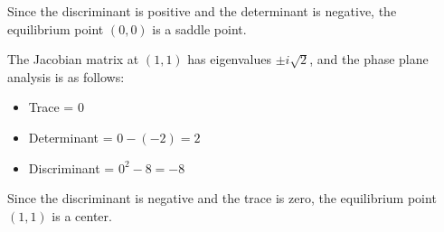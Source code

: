 \documentclass[11pt, letterpaper]{article}
\begin{document}
Since the discriminant is positive and the determinant is negative, the
equilibrium point $(0, 0)$ is a saddle point.

The Jacobian matrix at $(1, 1)$ has eigenvalues $\pm i\sqrt{2}$, and the phase
plane analysis is as follows:
\begin{itemize}
    \item Trace = $0$
    \item Determinant = $0 - (-2) = 2$
    \item Discriminant = $0^2 - 8 = -8$
\end{itemize}

Since the discriminant is negative and the trace is zero, the equilibrium point
$(1, 1)$ is a center.
\end{document}
